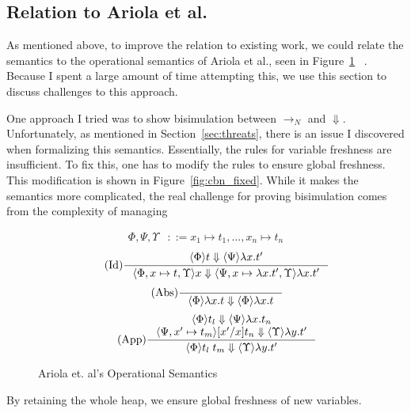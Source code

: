 \subsection{Relation to Ariola et al.}

As mentioned above, to improve the relation to existing work, we could relate
the semantics to the operational semantics of Ariola et al., seen in
Figure~\ref{fig:cbn} ~\cite{ariola1995call}. Because I spent a large amount of
time attempting this, we use this section to discuss challenges to this
approach. 

One approach I tried was to show bisimulation between $\rightarrow_{N}$ and
$\Downarrow$. Unfortunately, as mentioned in Section~\ref{sec:threats}, there is
an issue I discovered when formalizing this semantics. Essentially, the rules
for variable freshness are insufficient. To fix this, one has to modify the
rules to ensure global freshness. This modification is shown in
Figure~\ref{fig:cbn_fixed}. While it makes the semantics more complicated, the
real challenge for proving bisimulation comes from the complexity of managing  

\begin{figure}
\begin{align*}
\tag{Heap} \Phi, \Psi, \Upsilon &::= x_1 \mapsto t_1, \dots, x_n \mapsto t_n
\end{align*}
\begin{align*}
\tag{Id} \inference
{\langle \Phi \rangle t \Downarrow \langle \Psi \rangle \lambda x.t'}
{\langle \Phi, x \mapsto t, \Upsilon \rangle x \Downarrow \langle \Psi, x
\mapsto \lambda x.t', \Upsilon \rangle \lambda x.t'}
\end{align*}
\begin{align*}
\tag{Abs} \inference 
{}
{\langle \Phi \rangle \lambda x . t \Downarrow \langle \Phi \rangle \lambda x.t}
\end{align*}
\begin{align*}
\tag{App} \inference
{\langle \Phi \rangle t_l \Downarrow \langle \Psi \rangle \lambda 
x.t_n \\ \langle \Psi, x' \mapsto t_m \rangle [x'/x]t_n \Downarrow \langle
\Upsilon \rangle \lambda y.t'}
{\langle \Phi \rangle t_l \; t_m \Downarrow \langle \Upsilon \rangle \lambda y.t'}
\end{align*}
\caption{Ariola et. al's Operational Semantics}
\label{fig:cbn}
\end{figure}

By retaining the whole heap, we ensure global freshness of new variables. 

